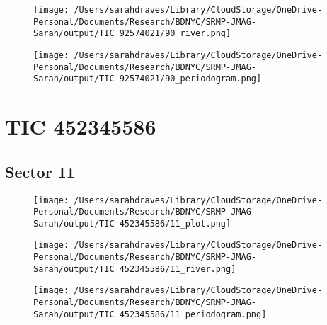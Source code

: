 \documentclass{report}%
\begin{document}
%


\begin{figure}[H]%
\begin{center}%
\centering%
\texttt{[image: /Users/sarahdraves/Library/CloudStorage/OneDrive-Personal/Documents/Research/BDNYC/SRMP-JMAG-Sarah/output/TIC 92574021/90\_river.png]}%
\end{center}%
\end{figure}

%


\begin{figure}[H]%
\begin{center}%
\centering%
\texttt{[image: /Users/sarahdraves/Library/CloudStorage/OneDrive-Personal/Documents/Research/BDNYC/SRMP-JMAG-Sarah/output/TIC 92574021/90\_periodogram.png]}%
\end{center}%
\end{figure}

%
\newpage%
\section{TIC 452345586}%
\label{sec:TIC452345586}%
\subsection{Sector 11}%
\label{subsec:TIC45234558611}%


\begin{figure}[H]%
\begin{center}%
\centering%
\texttt{[image: /Users/sarahdraves/Library/CloudStorage/OneDrive-Personal/Documents/Research/BDNYC/SRMP-JMAG-Sarah/output/TIC 452345586/11\_plot.png]}%
\end{center}%
\end{figure}

%


\begin{figure}[H]%
\begin{center}%
\centering%
\texttt{[image: /Users/sarahdraves/Library/CloudStorage/OneDrive-Personal/Documents/Research/BDNYC/SRMP-JMAG-Sarah/output/TIC 452345586/11\_river.png]}%
\end{center}%
\end{figure}

%


\begin{figure}[H]%
\begin{center}%
\centering%
\texttt{[image: /Users/sarahdraves/Library/CloudStorage/OneDrive-Personal/Documents/Research/BDNYC/SRMP-JMAG-Sarah/output/TIC 452345586/11\_periodogram.png]}%
\end{center}%
\end{figure}
\end{document}
